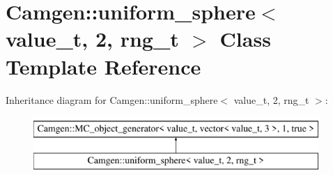 \hypertarget{a00551}{\section{Camgen\-:\-:uniform\-\_\-sphere$<$ value\-\_\-t, 2, rng\-\_\-t $>$ Class Template Reference}
\label{a00551}
}
Inheritance diagram for Camgen\-:\-:uniform\-\_\-sphere$<$ value\-\_\-t, 2, rng\-\_\-t $>$\-:\begin{figure}[H]
\begin{center}
\leavevmode
\includegraphics[height=2.000000cm]{a00551}
\end{center}
\end{figure}
